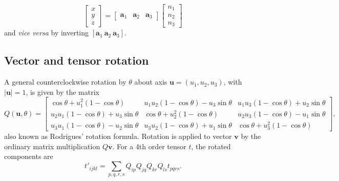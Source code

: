 \documentclass[11pt,a4paper]{article}
\begin{document}
\begin{equation}
\left[\begin{matrix} x \\ y \\ z \end{matrix}\right] = \left[\begin{matrix} \mathbf{a}_1 & \mathbf{a}_2 & \mathbf{a}_3  \end{matrix}\right] \left[\begin{matrix} n_1 \\ n_2 \\ n_3 \end{matrix}\right]
\end{equation}
and \emph{vice versa} by inverting $[\mathbf{a}_1 \ \mathbf{a}_2 \ \mathbf{a}_3]$.

\subsection{Vector and tensor rotation}
A general counterclockwise rotation by $\theta$ about axis $\mathbf{u} = (u_1, u_2, u_3)$, with $|\mathbf{u}| = 1$, is given by the matrix
\begin{equation}
Q(\mathbf{u},\theta) = \left[\begin{matrix}
\cos \theta + u_1^2 (1 - \cos \theta) & u_1 u_2 (1 -\cos \theta) - u_3 \sin \theta &  u_1 u_3 (1 -\cos \theta) + u_2 \sin \theta \\
u_2 u_1 (1 -\cos \theta) + u_3 \sin \theta & \cos \theta + u_2^2 (1 - \cos \theta) & u_2 u_3 (1 -\cos \theta) - u_1 \sin \theta \\
u_3 u_1 (1 -\cos \theta) - u_2 \sin \theta &  u_3 u_2 (1 -\cos \theta) + u_1 \sin \theta & \cos \theta + u_3^2 (1 - \cos \theta)
\end{matrix} \right],
\end{equation}
also known as Rodrigues' rotation formula. Rotation is applied to vector $\mathbf{v}$ by the ordinary matrix multiplication $Q\mathbf{v}$. For a 4th order tensor $t$, the rotated components are 
\begin{equation}
t'_{ijkl} = \sum_{p,q,r,s} Q_{ip}Q_{jq}Q_{kr}Q_{ls} t_{pqrs}.
\end{equation}
\end{document}
